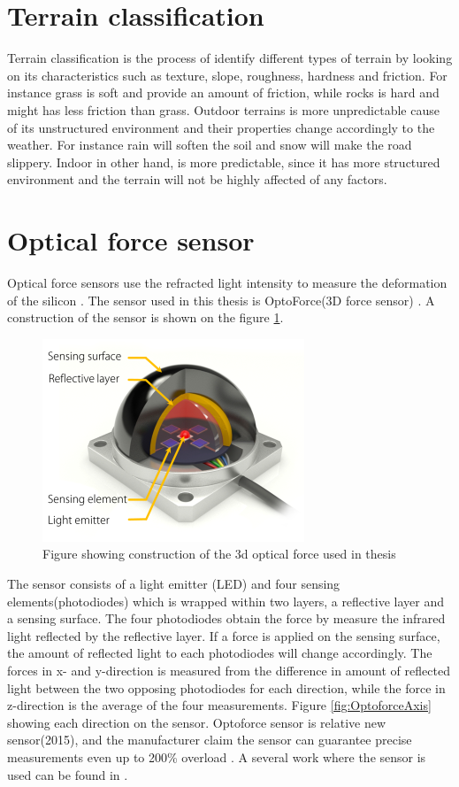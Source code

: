 \documentclass[USenglish]{ifimaster}  %
\begin{document}
\section{Terrain classification}
Terrain classification is the process of identify different types of terrain by looking on its characteristics such as texture, slope, roughness, hardness and friction. For instance grass is soft and provide an amount of friction, while rocks is hard and might has less friction than grass. Outdoor terrains is more unpredictable cause of its unstructured environment and their properties change accordingly to the weather. For instance rain will soften the soil and snow will make the road slippery. Indoor in other hand, is more predictable, since it has more structured environment and the terrain will not be highly affected of any factors.
	
	
\section{Optical force sensor}
Optical force sensors use the refracted light intensity to measure the deformation of the silicon \cite{6027100}\cite{6907805}. The sensor used in this thesis is OptoForce(3D force sensor) \cite{Optoforce}. A construction of the sensor is shown on the figure \ref{fig:OptoforceBuild}. 
\begin{figure}[h]
	\centering
	\includegraphics[scale=0.8]{Figures/OptoforceBuild}
	\caption{Figure showing construction of the 3d optical force used in thesis \cite{OptoforceFig}}
	\label{fig:OptoforceBuild}
\end{figure}
\FloatBarrier
	
The sensor consists of a light emitter (LED) and four sensing elements(photodiodes) which is wrapped within two layers, a reflective layer and a sensing surface. The four photodiodes obtain the force by measure the infrared light reflected by the reflective layer. If a force is applied on the sensing surface, the amount of reflected light to each photodiodes will change accordingly. The forces in x- and y-direction is measured from the difference in amount of reflected light between the two opposing photodiodes for each direction, while the force in z-direction is the average of the four measurements. Figure \ref{fig:OptoforceAxis} showing each direction on the sensor. Optoforce sensor is relative new sensor(2015), and the manufacturer claim the sensor can guarantee precise measurements even up to 200\% overload \cite{Optoforce2}. A several work where the sensor is used can be found in \cite{7803326,7759112,7849467}.
	
\end{document}
